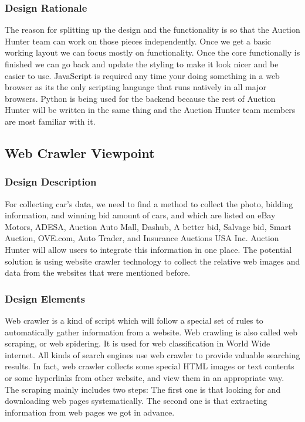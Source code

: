 \documentclass[onecolumn, draftclsnofoot, 10pt, compsoc]{IEEEtran}
\begin{document}
\subsubsection{Design Rationale}
The reason for splitting up the design and the functionality is so that the Auction Hunter team can work on those pieces independently. Once we get a basic working layout we can focus mostly on functionality. Once the core functionally is finished we can go back and update the styling to make it look nicer and be easier to use. JavaScript is required any time your doing something in a web browser as its the only scripting language that runs natively in all major browsers. Python is being used for the backend because the rest of Auction Hunter will be written in the same thing and the Auction Hunter team members are most familiar with it. 


\subsection{Web Crawler Viewpoint}
\subsubsection{Design Description}
For collecting car’s data, we need to find a method to collect the photo, bidding information, and winning bid amount of cars, and which are listed on eBay Motors, ADESA, Auction Auto Mall, Dashub, A better bid, Salvage bid, Smart Auction, OVE.com, Auto Trader, and Insurance Auctions USA Inc. Auction Hunter will allow users to integrate this information in one place. The potential solution is using website crawler technology to collect
the relative web images and data from the websites that were mentioned before. 
\subsubsection{Design Elements}
Web crawler is a kind of script which will follow a special set of rules to automatically gather information from a website. Web crawling is also called web scraping, or web spidering. It is used for web classification in World Wide internet. All kinds of search engines use web crawler to provide valuable searching results. In fact, web crawler collects some special HTML images or text contents or some hyperlinks from other website, and view them in an appropriate way. The scraping mainly includes two steps: The first one is that looking for and downloading web pages systematically. The second one is that extracting information from web pages we got in advance.
\end{document}
